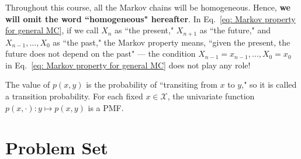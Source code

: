 \documentclass[11pt,letterpaper, leqno]{article}
\numberwithin{equation}{section}
\numberwithin{theorem}{section}
\numberwithin{lemma}{section}
\numberwithin{corollary}{section}
\numberwithin{definition}{section}
\numberwithin{proposition}{section}
\numberwithin{remark}{section}
\numberwithin{example}{section}
\begin{document}
Throughout this course, all the Markov chains will be homogeneous. Hence, \textbf{we will omit the word ``homogeneous" hereafter}. In Eq.~\eqref{eq: Markov property for general MC}, if we call $X_n$ as ``the present," $X_{n+1}$ as ``the future," and $X_{n-1},\ldots,X_0$ as ``the past," the Markov property means, ``given the present, the future does not depend on the past" --- the condition $X_{n-1}=x_{n-1},\ldots, X_0=x_0$ in Eq.~\eqref{eq: Markov property for general MC} does not play any role!

The value of $p(x,y)$ is the probability of ``transiting from $x$ to $y$," so it is called a transition probability. For each fixed $x\in\mathcal{X}$, the univariate function $p(x,\cdot): y\mapsto p(x,y)$ is a PMF.

\pagebreak 
\section{Problem Set}
\end{document}
